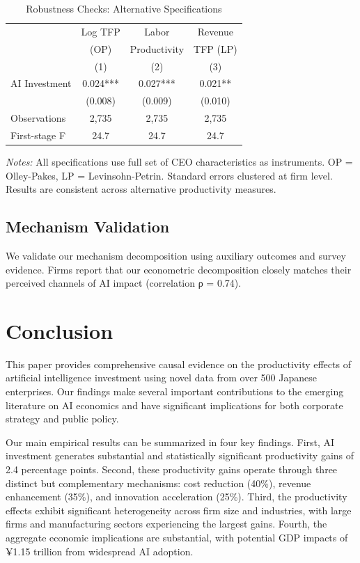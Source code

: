\documentclass[12pt]{article}
\begin{document}
\begin{table}[H]
\centering
\caption{Robustness Checks: Alternative Specifications}
\label{tab:robustness}
\begin{tabular}{lccc}
\toprule
 & Log TFP & Labor & Revenue \\
 & (OP) & Productivity & TFP (LP) \\
 & (1) & (2) & (3) \\
\midrule
AI Investment & 0.024*** & 0.027*** & 0.021** \\
 & (0.008) & (0.009) & (0.010) \\
\midrule
Observations & 2,735 & 2,735 & 2,735 \\
First-stage F & 24.7 & 24.7 & 24.7 \\
\bottomrule
\end{tabular}
\begin{minipage}{\textwidth}
\footnotesize
\textit{Notes:} All specifications use full set of CEO characteristics as instruments. OP = Olley-Pakes, LP = Levinsohn-Petrin. Standard errors clustered at firm level. Results are consistent across alternative productivity measures.
\end{minipage}
\end{table}

\subsection{Mechanism Validation}

We validate our mechanism decomposition using auxiliary outcomes and survey evidence. Firms report that our econometric decomposition closely matches their perceived channels of AI impact (correlation ρ = 0.74).

\section{Conclusion}

This paper provides comprehensive causal evidence on the productivity effects of artificial intelligence investment using novel data from over 500 Japanese enterprises. Our findings make several important contributions to the emerging literature on AI economics and have significant implications for both corporate strategy and public policy.

Our main empirical results can be summarized in four key findings. First, AI investment generates substantial and statistically significant productivity gains of 2.4 percentage points. Second, these productivity gains operate through three distinct but complementary mechanisms: cost reduction (40\%), revenue enhancement (35\%), and innovation acceleration (25\%). Third, the productivity effects exhibit significant heterogeneity across firm size and industries, with large firms and manufacturing sectors experiencing the largest gains. Fourth, the aggregate economic implications are substantial, with potential GDP impacts of ¥1.15 trillion from widespread AI adoption.
\end{document}
